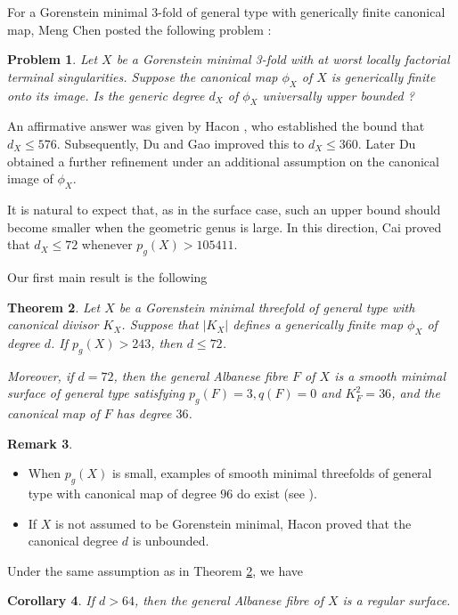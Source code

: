 \documentclass[11pt]{amsart}
\theoremstyle{plain}
\newtheorem{thm}{Theorem}[section]
\newtheorem{cor}[thm]{Corollary}
\newtheorem{problem}[thm]{Problem}
\theoremstyle{definition}
\newtheorem{rmk}[thm]{Remark}
\numberwithin{equation}{section}
\begin{document}
For a Gorenstein minimal $3$-fold of general type with generically finite canonical map,  Meng Chen \cite[\S 2.10]{Chen05} posted the following problem :
\begin{problem}
Let $X$ be a Gorenstein minimal 3-fold with at worst locally factorial terminal singularities. Suppose the canonical map $\phi_{X}$ of $X$ is generically finite onto its image. Is the generic degree $d_X$ of $\phi_X$ universally upper bounded ?
\end{problem}
An affirmative answer was given by Hacon \cite{Hac04}, who  established the bound that $d_X\leq 576$. Subsequently, Du and Gao \cite{DG16} improved this to  $d_X\leq 360$. Later Du \cite{Du18} obtained a further refinement under an additional assumption on the canonical image of $\phi_X$.



It is natural to expect that, as in the surface case, such an upper bound should become smaller when the geometric genus is large. In this direction,  Cai \cite{Cai08} proved that $d_X\leq 72$ whenever $p_g(X)>105411$.  

Our first main result is the following
\begin{thm}\label{thm:main}
   Let $X$ be a Gorenstein minimal  threefold of general type with canonical divisor $K_X$. Suppose that $|K_X|$ defines a generically finite map $\phi_X$ of degree $d$. If $p_g(X)>243$, then $d\leq72$. 
   
   Moreover, if $d=72$, then  the general Albanese fibre $F$ of  $X$ is a smooth  minimal surface of general type satisfying $p_g(F)=3,q(F)=0$ and $K_F^2=36$, and the canonical map of $F$ has degree $36$.
\end{thm}

\begin{rmk}
\begin{itemize}
    \item[(1)]  When $p_g(X)$ is small, examples of smooth minimal threefolds of general type with canonical map of degree $96$ do exist (see \cite{FG20}).
    \item[(2)] If $X$ is not assumed to be Gorenstein minimal, Hacon \cite{Hac04} proved that the canonical degree $d$ is unbounded.
\end{itemize} 
\end{rmk}
 Under the same assumption as in Theorem \ref{thm:main}, we have
\begin{cor}\label{cor:main}
    If  $d>64$, then  the general Albanese fibre of $X$ is a regular surface.
\end{cor}
\end{document}
